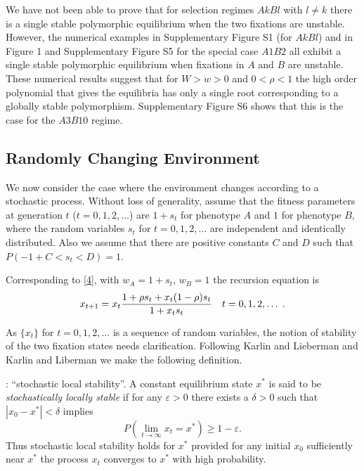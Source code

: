 \documentclass[9pt,twocolumn,twoside,lineno]{pnas-new}
\newcommand{\var}{\varepsilon}
\begin{document}
We have not been able to prove that for selection regimes $AkBl$ with $l\ne k$ there is a single stable polymorphic equilibrium when the two fixations are unstable. However, the numerical examples in Supplementary Figure S1 (for $AkBl$) and in Figure 1 and Supplementary Figure S5 for the special case $A1B2$ all exhibit a single stable polymorphic equilibrium when fixations in $A$ and $B$ are unstable. These numerical results suggest that for $W>w>0$ and $0<\rho<1$ the high order polynomial that gives the equilibria has only a single root corresponding to a globally stable polymorphism. Supplementary Figure S6 shows that this is the case for the $A3B10$ regime.

 
\subsection{Randomly Changing Environment}
 
 We now consider the  case where the environment changes according to a stochastic process. Without loss of generality, assume that the fitness parameters at generation $t$ ($t=0,1,2,\dots$) are $1+s_t$ for phenotype $A$ and $1$ for phenotype $B$, where the random variables $s_t$ for $t=0,1,2,\dots$ are independent and identically distributed. Also we assume that there are positive constants $C$ and $D$ such that $P(-1+C<s_t <D)=1$.
 
 Corresponding to \eqref{4}, with $w_A=1+s_t$, $w_B=1$ the recursion equation is
 \begin{equation}
 x_{t+1}=x_t {1+\rho s_t +x_t(1-\rho)s_t\over 1+x_ts_t}\quad t=0,1,2,\dots\; .\label{28}\end{equation}
 
\noindent As $\{x_t\}$ for $t=0,1,2,\dots$ is a sequence of random variables, the notion of stability of the two fixation states needs clarification. Following Karlin and Lieberman \cite{karlin1974random} and Karlin and Liberman \cite{karlin1975random} we make the following definition.
 \medskip
 
 : ``stochastic local stability''.
 A constant equilibrium state $x^*$ is said to be {\sl stochastically locally stable} if for any $\var>0$ there exists a $\delta>0$ such that $|x_0-x^*|<\delta$ implies
 \begin{equation}
 P\left(\lim_{t\to\infty}x_t =x^*\right)\ge 1-\var.\label{29}\end{equation}
 Thus stochastic local stability holds for $x^*$ provided for any initial $x_0$ sufficiently near $x^*$ the process $x_t$ converges to $x^*$ with high probability.
 
\end{document}
